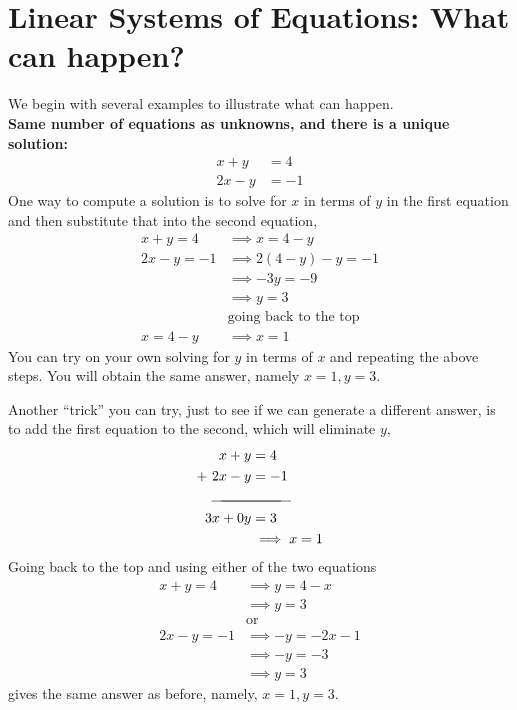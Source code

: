 \section{Linear Systems of Equations: What can happen?}
\label{sec:WhatCanHappen}

We begin with several examples to illustrate what can happen.\\

\noindent \textbf{Same number of equations as unknowns, and there is a unique solution:}
\begin{equation}
\label{eq:SLE:Ex1}
\begin{aligned}
x+y &=4 \\
2x-y&=-1
\end{aligned}
\end{equation}
One way to compute a solution is to solve for $x$ in terms of $y$ in the first equation and then substitute that into the second equation,
\begin{align*}
x+y =4 & \implies x = 4-y\\
2x-y=-1 & \implies 2(4-y)-y=-1\\
& \implies -3y=-9 \\
& \implies y = 3\\
&\text{going back to the top}\\
x = 4-y & \implies x=1
\end{align*}
You can try on your own solving for $y$ in terms of $x$ and repeating the above steps. You will obtain the same answer, namely $x=1, y=3$. 

Another ``trick'' you can try, just to see if we can generate a different answer, is to add the first equation to the second, which will eliminate $y$,
\begin{align*}
x+y &=4 \\
+~ 2x-y&=-1\\ \vspace*{-0.2cm}
\mathclap{\rule{2cm}{0.4pt}}& \mathclap{\rule{1.5cm}{0.4pt}} \vspace*{-0.2cm} \\
 3x + 0 y & =3 \\
 & \implies x=1 \\
\end{align*}
Going back to the top and using either of the two equations
\begin{align*}
 x+y =4 & \implies y = 4-x \\
 & \implies y = 3 \\
& \text{or} \\
 2x-y=-1 &\implies -y = -2x - 1\\
 & \implies -y = -3\\
 & \implies y = 3
\end{align*}
gives the same answer as before, namely,  $x=1, y=3$. \\

